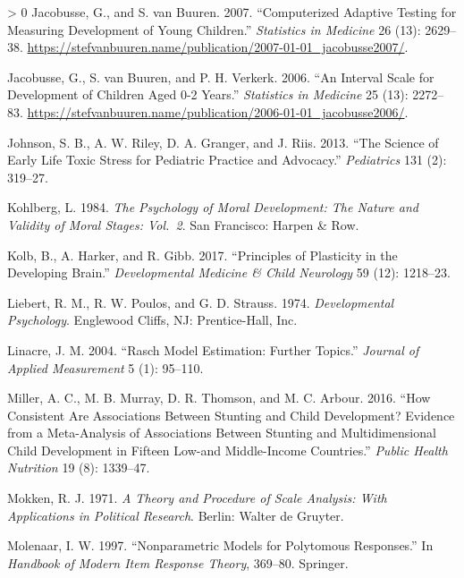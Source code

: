 \documentclass[
]{book}
\newlength{\cslhangindent}
\newenvironment{CSLReferences}[3] %
 {%
  \setlength{\parindent}{0pt}
  \ifodd #1 \everypar{\setlength{\hangindent}{\cslhangindent}}\ignorespaces\fi
  \ifnum #2 > 0
  \setlength{\parskip}{#2\baselineskip}
  \fi
 }%
 {}
\begin{document}
\begin{CSLReferences}{1}{0}
\leavevmode\hypertarget{ref-jacobusse2007}{}%
Jacobusse, G., and S. van Buuren. 2007. {``Computerized Adaptive Testing for Measuring Development of Young Children.''} \emph{Statistics in Medicine} 26 (13): 2629--38. \url{https://stefvanbuuren.name/publication/2007-01-01_jacobusse2007/}.

\leavevmode\hypertarget{ref-jacobusse2006}{}%
Jacobusse, G., S. van Buuren, and P. H. Verkerk. 2006. {``An Interval Scale for Development of Children Aged 0-2 Years.''} \emph{Statistics in Medicine} 25 (13): 2272--83. \url{https://stefvanbuuren.name/publication/2006-01-01_jacobusse2006/}.

\leavevmode\hypertarget{ref-johnson2013science}{}%
Johnson, S. B., A. W. Riley, D. A. Granger, and J. Riis. 2013. {``The Science of Early Life Toxic Stress for Pediatric Practice and Advocacy.''} \emph{Pediatrics} 131 (2): 319--27.

\leavevmode\hypertarget{ref-kohlberg1984}{}%
Kohlberg, L. 1984. \emph{The Psychology of Moral Development: The Nature and Validity of Moral Stages: Vol.~2}. San Francisco: Harpen \& Row.

\leavevmode\hypertarget{ref-kolb2017principles}{}%
Kolb, B., A. Harker, and R. Gibb. 2017. {``Principles of Plasticity in the Developing Brain.''} \emph{Developmental Medicine \& Child Neurology} 59 (12): 1218--23.

\leavevmode\hypertarget{ref-liebert1974}{}%
Liebert, R. M., R. W. Poulos, and G. D. Strauss. 1974. \emph{Developmental Psychology}. Englewood Cliffs, NJ: Prentice-Hall, Inc.

\leavevmode\hypertarget{ref-linacre2004}{}%
Linacre, J. M. 2004. {``Rasch Model Estimation: Further Topics.''} \emph{Journal of Applied Measurement} 5 (1): 95--110.

\leavevmode\hypertarget{ref-miller2016consistent}{}%
Miller, A. C., M. B. Murray, D. R. Thomson, and M. C. Arbour. 2016. {``How Consistent Are Associations Between Stunting and Child Development? Evidence from a Meta-Analysis of Associations Between Stunting and Multidimensional Child Development in Fifteen Low-and Middle-Income Countries.''} \emph{Public Health Nutrition} 19 (8): 1339--47.

\leavevmode\hypertarget{ref-mokken1971}{}%
Mokken, R. J. 1971. \emph{A Theory and Procedure of Scale Analysis: With Applications in Political Research}. Berlin: Walter de Gruyter.

\leavevmode\hypertarget{ref-molenaar1997}{}%
Molenaar, I. W. 1997. {``Nonparametric Models for Polytomous Responses.''} In \emph{Handbook of Modern Item Response Theory}, 369--80. Springer.


\end{CSLReferences}
\end{document}
